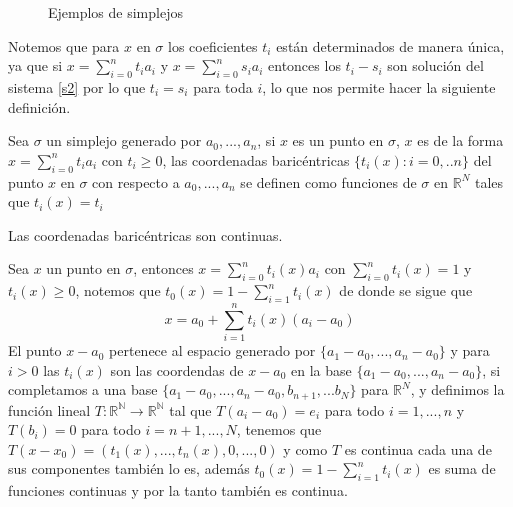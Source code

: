 \begin{figure}[h]
\centering
{}
\caption{Ejemplos de simplejos}
\end{figure}

Notemos que para $x$ en $\sigma$ los coeficientes $t_i$ están determinados de manera única, ya que si $x = \sum_{i=0}^{n}t_ia_i$ y $x = \sum_{i=0}^{n}s_ia_i$ entonces los $t_i-s_i$ son solución del sistema \ref{s2} por lo que $t_i=s_i$ para toda $i$, lo que nos permite hacer la 
siguiente definición.
\begin{Defi}
Sea $\sigma$ un simplejo generado por $a_0,...,a_n$, si $x$ es un punto en $\sigma$, $x$ es de la forma $x = \sum_{i=0}^{n}t_ia_i$ con $t_i\geqslant 0$, las coordenadas baricéntricas $\{t_i(x):i = 0,..n\}$ del punto $x$ en $\sigma$ con respecto a $a_0,...,a_n$ se definen como funciones de $\sigma$ en $\mathbb{R}^{N}$ tales que $t_i(x) = t_i$
\end{Defi}
\begin{Prop}
Las coordenadas baricéntricas son continuas.
\end{Prop}
\begin{Dem}

Sea $x$ un punto en $\sigma$, entonces $x=\sum_{i=0}^{n}t_i(x)a_i$ con $\sum_{i=0}^{n}t_i(x)=1$ y 
$t_i(x)\geq 0$, notemos que $t_0(x) = 1-\sum_{i=1}^{n}t_i(x)$ de donde se sigue que 
\begin{equation}
x = a_0 + \sum_{i=1}^{n}t_i(x)(a_i-a_0)
\end{equation}
El punto $x-a_0$ pertenece al espacio generado por $\{a_1-a_0,...,a_n-a_0\}$ y para $i>0$ las $t_i(x)$  son las coordendas de $x-a_0$ en la base $\{a_1-a_0,...,a_n-a_0\}$, si completamos a una base $\{a_1-a_0,...,a_n-a_0,b_{n+1},...b_N\}$ para $\mathbb{R}^N$,  y definimos la función lineal $T\colon \mathbb{R^N}\rightarrow \mathbb{R^N}$ tal que $T(a_i-a_0) = e_i$ para todo $i=1,...,n$ y $T(b_i) = 0$ para todo $i = n+1,...,N$, tenemos que $T(x-x_0) = (t_1(x),...,t_n(x),0,...,0)$ y como $T$ es continua cada una de sus componentes también lo es, además $t_0(x) = 1-\sum_{i=1}^{n}t_i(x)$ es suma de funciones continuas y por la tanto también es continua. 
\end{Dem}
